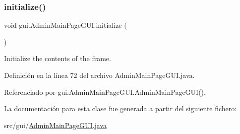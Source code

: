 \subsubsection{\texorpdfstring{initialize()}{initialize()}}
{\footnotesize\ttfamily void gui.\+Admin\+Main\+Page\+G\+U\+I.\+initialize (\begin{DoxyParamCaption}{ }\end{DoxyParamCaption})\hspace{0.3cm}{\ttfamily [private]}}

Initialize the contents of the frame. 

Definición en la línea 72 del archivo Admin\+Main\+Page\+G\+U\+I.\+java.


\begin{DoxyCode}{0}

\end{DoxyCode}


Referenciado por gui.\+Admin\+Main\+Page\+G\+U\+I.\+Admin\+Main\+Page\+G\+U\+I().



La documentación para esta clase fue generada a partir del siguiente fichero\+:\begin{DoxyCompactItemize}
\item 
src/gui/\mbox{\hyperlink{AdminMainPageGUI_8java}{Admin\+Main\+Page\+G\+U\+I.\+java}}\end{DoxyCompactItemize}
